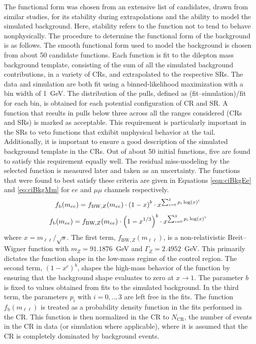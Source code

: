 The functional form was chosen from an extensive list of candidates, drawn from similar studies, for its stability during extrapolations and the ability to model the simulated background. Here, stability refers to the function not to tend to behave nonphysically.
The procedure to determine the functional form of the background is as follows.
The smooth functional form used to model the background is chosen from about 50 candidate functions.
Each function is fit to the dilepton mass background template, consisting of the sum of all the simulated background contributions, in a variety of CRs, and extrapolated to the respective SRs.
The data and simulation are both fit using a binned-likelihood maximization with a bin width of 1~GeV.
The distribution of the pulls, defined as (fit--simulation)/fit for each bin, is obtained for each potential configuration of CR and SR.
A function that results in pulls below three across all the ranges considered (CRs and SRs) is marked as acceptable.
This requirement is particularly important in the SRs to veto functions that exhibit unphysical behavior at the tail.
Additionally, it is important to ensure a good description of the simulated background template in the CRs.
Out of about 50 initial functions, five are found to satisfy this requirement equally well.
The residual miss-modeling by the selected function is measured later and taken as an uncertainty.
The functions that were found to best satisfy these criteria are given in Equations \ref{eqn:ciBkgEe} and \ref{eq:ciBkgMm} for $ee$ and $\mu\mu$ channels respectively.
\begin{equation}\begin{split} \label{eqn:ciBkgEe}
f_\textrm{b}(m_{ee}) &= f_{\mathrm{BW},Z}(m_{ee}) \cdot \left(1 - x\right)^{b} \cdot x^{\sum_{i=0}^3 p_i\log(x)^i} \\
\end{split}\end{equation} 
\begin{equation}\begin{split}\label{eqn:ciBkgMm}
f_\textrm{b}(m_{ee}) &= f_{\mathrm{BW},Z}(m_{ee}) \cdot \left(1 - x^{1/3}\right)^{b} \cdot x^{\sum_{i=0}^3 p_i\log(x)^i} \\
\end{split}\end{equation} 
where $x = m_{\ell\ell}/\sqrt{s}$.
The first term, $f_{\mathrm{BW},Z}(m_{\ell\ell})$, is a non-relativistic Breit--Wigner function with $m_Z = 91.1876$~GeV and $\Gamma_Z = 2.4952$~GeV.
This primarily dictates the function shape in the low-mass regime of the control region.
The second term, $(1-x^{c})^{b}$, shapes the high-mass behavior of the function by ensuring that the background shape evaluates to zero at $x\to 1$.
The parameter $b$ is fixed to values obtained from fits to the simulated background.
In the third term, the parameters $p_i$ with $i=0,..,3$ are left free in the fits.
The function $f_\textrm{b}(m_{\ell\ell})$ is treated as a probability density function in the fits performed in the CR.
This function is then normalized in the CR to $N_\textrm{CR}$, the number of events in the CR in data (or simulation where applicable), where it is assumed that the CR is completely dominated by background events.

